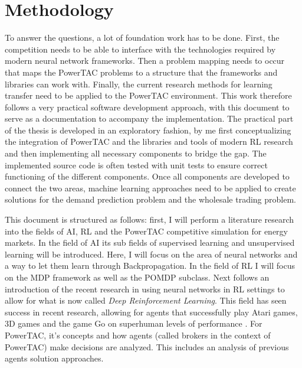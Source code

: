 \section{Methodology}
\label{sec:methodology}
To answer the questions, a lot of foundation work has to be done. First, the competition needs to be able to interface
with the technologies required by modern neural network frameworks. Then a problem mapping needs to occur that maps the
\ac{PowerTAC} problems to a structure that the frameworks and libraries can work with. Finally, the current research
methods for learning transfer need to be applied to the \ac{PowerTAC} environment. This work therefore follows a very
practical software development approach, with this document to serve as a documentation to accompany the
implementation. The practical part of the thesis is developed in an exploratory fashion, by me first conceptualizing
the integration of \ac{PowerTAC}  and the libraries and tools of modern \ac{RL} research and then implementing all
necessary components to bridge the gap. The implemented source code is often tested with unit tests to ensure correct
functioning of the different components. Once all components are developed to connect the two areas, machine learning
approaches need to be applied to create solutions for the demand prediction problem and the wholesale trading problem. 

This document is structured as follows: first, I will perform a literature research into the fields of \ac{AI}, \ac{RL}
and the \ac{PowerTAC} competitive simulation for energy markets. In the field of AI its sub fields of supervised learning and
unsupervised learning will be introduced. Here,  I will focus on the area of neural networks and a way to let them learn through
Backpropagation. In the field of \ac{RL} I will focus on the \ac{MDP} framework as well as the \ac{POMDP} subclass.
Next follows an introduction of the recent research in using neural networks in \ac{RL} settings to allow for what is
now called \emph{Deep Reinforcement Learning}. This field has seen success in recent research, allowing for agents that
successfully play Atari games, 3D games and the game Go on superhuman levels of performance \citep{proximalpolicyopt,
silver2016mastering}.  For \ac{PowerTAC}, it's concepts and how agents (called brokers in the context of \ac{PowerTAC})
make decisions are analyzed. This includes an analysis of previous agents solution approaches.


